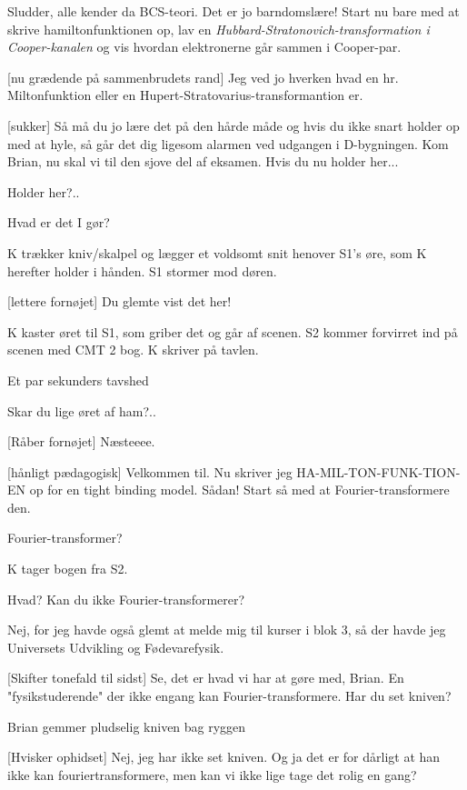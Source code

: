 \documentclass[a4paper,11pt]{article}
\begin{document}
\begin{sketch}
 Sludder, alle kender da BCS-teori. Det er jo barndomslære! Start nu bare med at skrive hamiltonfunktionen op, lav en \emph{Hubbard-Stratonovich-transformation i Cooper-kanalen} og vis hvordan elektronerne går sammen i Cooper-par.

[nu grædende på sammenbrudets rand] Jeg ved jo hverken hvad en hr. Miltonfunktion eller en Hupert-Stratovarius-transformantion er.

[sukker] Så må du jo lære det på den hårde måde og hvis du ikke snart holder op med at hyle, så går det dig ligesom alarmen ved udgangen i D-bygningen. Kom Brian, nu skal vi til den sjove del af eksamen. Hvis du nu holder her...

 Holder her?..

 Hvad er det I gør?

\scene K trækker kniv/skalpel og lægger et voldsomt snit henover S1's øre, som K herefter holder i hånden. S1 stormer mod døren.

[lettere fornøjet] Du glemte vist det her!

\scene K kaster øret til S1, som griber det og går af scenen. S2 kommer forvirret ind på scenen med CMT 2 bog. K skriver på tavlen.

\scene Et par sekunders tavshed

 Skar du lige øret af ham?..

[Råber fornøjet] Næsteeee.

[hånligt pædagogisk] Velkommen til. Nu skriver jeg HA-MIL-TON-FUNK-TION-EN op for en tight binding model. Sådan! Start så med at Fourier-transformere den.

 Fourier-transformer?

K tager bogen fra S2.

 Hvad? Kan du ikke Fourier-transformerer?

 Nej, for jeg havde også glemt at melde mig til kurser i blok 3, så der havde jeg Universets Udvikling og Fødevarefysik.

[Skifter tonefald til sidst] Se, det er hvad vi har at gøre med, Brian. En "fysikstuderende" der ikke engang kan Fourier-transformere. Har du set kniven?

\scene Brian gemmer pludselig kniven bag ryggen

[Hvisker ophidset] Nej, jeg har ikke set kniven. Og ja det er for dårligt at han ikke kan fouriertransformere, men kan vi ikke lige tage det rolig en gang?


\end{sketch}
\end{document}
